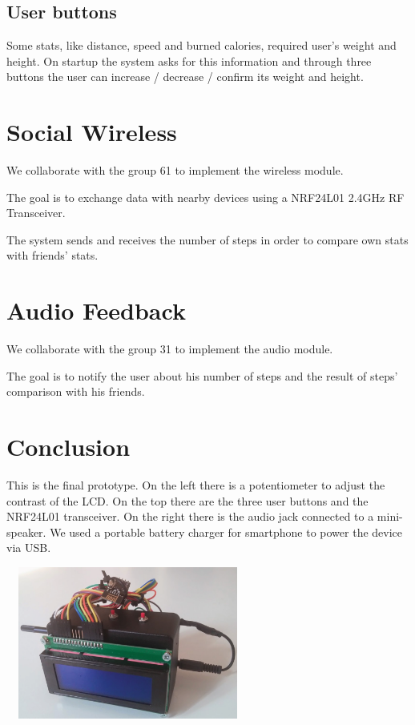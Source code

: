 \documentclass[a4paper,10pt]{article}
\makeatletter
\newenvironment{figurehere}{\def\@captype{figure}\vspace{2ex}}{\vspace{1ex}}
\makeatother
\begin{document}
\begin{multicols}{2}
\subsection{User buttons}
Some stats, like distance, speed and burned calories, required user's weight and height. 
On startup the system asks for this information and through three buttons the user can increase / decrease / confirm its weight and height.

\section{Social Wireless}
We collaborate with the group 61 to implement the wireless module. \cite{group61}

The goal is to exchange data with nearby devices using a NRF24L01 2.4GHz RF Transceiver.

The system sends and receives the number of steps in order to compare own stats with friends' stats.

\section{Audio Feedback}

We collaborate with the group 31 to implement the audio module. \cite{group31}

The goal is to notify the user about his number of steps and the result of steps' comparison with his friends.


\section{Conclusion}

This is the final prototype. On the left there is a potentiometer to adjust the contrast of the LCD. On the top there are the three user buttons and the NRF24L01 transceiver. On the right there is the audio jack
connected to a mini-speaker. We used a portable battery charger for smartphone to power the device via USB.

\begin{figurehere}
 \centering
 \includegraphics[width=8cm, height=5cm]{./eps/proto.eps}
 \label{fig:prototype}
\end{figurehere}




\end{multicols}
\end{document}
